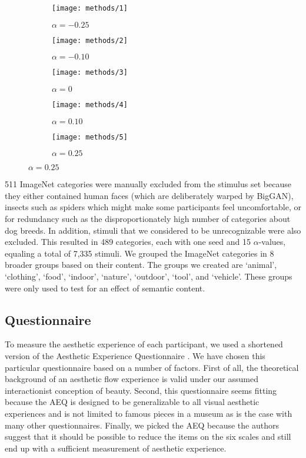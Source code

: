 \documentclass[../main.tex]{subfiles}
\begin{document}
\begin{figure}[!h]
	\caption{Sample of an Image Sequence With Five $\alpha$-values}
	\label{fig:sample_sequence}
	\centering
	\begin{subfigure}{.18\textwidth}
		\centering
		\texttt{[image: methods/1]}
		\caption{\centering $\alpha = -0.25$}
	\end{subfigure} \hfill
	\begin{subfigure}{.18\textwidth}
		\centering
		\texttt{[image: methods/2]}
		\caption{\centering $\alpha = -0.10$}
	\end{subfigure} \hfill
	\begin{subfigure}{.18\textwidth}
		\centering
		\texttt{[image: methods/3]}
		\caption{\centering $\alpha = 0$}
	\end{subfigure} \hfill
	\begin{subfigure}{.18\textwidth}
		\centering
		\texttt{[image: methods/4]}
		\caption{\centering $\alpha = 0.10$}
	\end{subfigure} \hfill
	\begin{subfigure}{.18\textwidth}
		\centering
		\texttt{[image: methods/5]}
		\caption{\centering $\alpha = 0.25$}
	\end{subfigure} \hfill
\end{figure}

511 ImageNet categories were manually excluded from the stimulus set because they either contained human faces (which are deliberately warped by BigGAN), insects such as spiders which might make some participants feel uncomfortable, or for redundancy such as the disproportionately high number of categories about dog breeds. In addition, stimuli that we considered to be unrecognizable were also excluded. This resulted in 489 categories, each with one seed and 15 $\alpha$-values, equaling a total of 7,335 stimuli. We grouped the ImageNet categories in 8 broader groups based on their content. The groups we created are `animal', `clothing', `food', `indoor', `nature', `outdoor', `tool', and `vehicle'. These groups were only used to test for an effect of semantic content.
	

	
\subsection{Questionnaire}
To measure the aesthetic experience of each participant, we used a shortened version of the Aesthetic Experience Questionnaire \parencite[AEQ;][]{wanzerExperiencingFlowViewing2020}. We have chosen this particular questionnaire based on a number of factors. First of all, the theoretical background of an aesthetic flow experience \parencite{csikszentmihalyi1990art} is valid under our assumed interactionist conception of beauty. Second, this questionnaire seems fitting because the AEQ is designed to be generalizable to all visual aesthetic experiences and is not limited to famous pieces in a museum as is the case with many other questionnaires. Finally, we picked the AEQ because the authors suggest that it should be possible to reduce the items on the six scales and still end up with a sufficient measurement of aesthetic experience.
\end{document}
